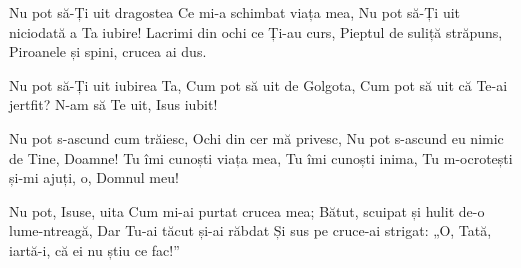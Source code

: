 \beginverse
Nu pot să-Ți uit dragostea
Ce mi-a schimbat viața mea,
Nu pot să-Ți uit niciodată a Ta iubire!
Lacrimi din ochi ce Ți-au curs,
Pieptul de suliță străpuns,
Piroanele și spini, crucea ai dus.
\endverse

\beginchorus
Nu pot să-Ți uit iubirea Ta,
Cum pot să uit de Golgota,
Cum pot să uit că Te-ai jertfit?
N-am să Te uit, Isus iubit!
\endchorus

\beginverse
Nu pot s-ascund cum trăiesc,
Ochi din cer mă privesc,
Nu pot s-ascund eu nimic de Tine, Doamne!
Tu îmi cunoști viața mea,
Tu îmi cunoști inima,
Tu m-ocrotești și-mi ajuți, o, Domnul meu!
\endverse

\beginverse
Nu pot, Isuse, uita
Cum mi-ai purtat crucea mea;
Bătut, scuipat și hulit de-o lume-ntreagă,
Dar Tu-ai tăcut și-ai răbdat
Și sus pe cruce-ai strigat:
„O, Tată, iartă-i, că ei nu știu ce fac!”
\endverse
\endsong